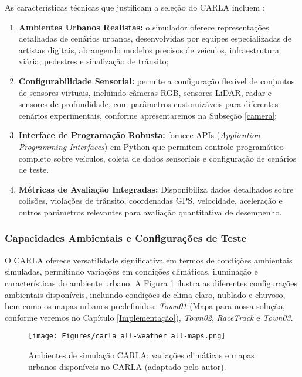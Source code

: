 As características técnicas que justificam a seleção do CARLA incluem \cite{dosovitskiy2017carla}:

\begin{enumerate}
\item \textbf{Ambientes Urbanos Realistas:} o simulador oferece representações detalhadas de cenários urbanos, desenvolvidas por equipes especializadas de artistas digitais, abrangendo modelos precisos de veículos, infraestrutura viária, pedestres e sinalização de trânsito;

\item \textbf{Configurabilidade Sensorial:} permite a configuração flexível de conjuntos de sensores virtuais, incluindo câmeras RGB, sensores LiDAR, radar e sensores de profundidade, com parâmetros customizáveis para diferentes cenários experimentais, conforme apresentaremos na Subseção \ref{camera};

\item \textbf{Interface de Programação Robusta:} fornece APIs (\textit{Application Programming Interfaces}) em Python que permitem controle programático completo sobre veículos, coleta de dados sensoriais e configuração de cenários de teste.

\item \textbf{Métricas de Avaliação Integradas:} Disponibiliza dados detalhados sobre colisões, violações de trânsito, coordenadas GPS, velocidade, aceleração e outros parâmetros relevantes para avaliação quantitativa de desempenho.
\end{enumerate}

\subsubsection{Capacidades Ambientais e Configurações de Teste}

O CARLA oferece versatilidade significativa em termos de condições ambientais simuladas, permitindo variações em condições climáticas, iluminação e características do ambiente urbano. A Figura \ref{carla_weather} ilustra as diferentes configurações ambientais disponíveis, incluindo condições de clima claro, nublado e chuvoso, bem como os mapas urbanos predefinidos: \textit{Town01} (Mapa para nossa solução, conforme veremos no Capítulo \ref{Implementação}), \textit{Town02}, \textit{RaceTrack} e \textit{Town03}.

\begin{figure}[H]
\centering
\texttt{[image: Figures/carla\_all-weather\_all-maps.png]}
\caption{Ambientes de simulação CARLA: variações climáticas e mapas urbanos disponíveis no CARLA \cite{noauthor_undated} (adaptado pelo autor).}
\label{carla_weather}
\end{figure}

